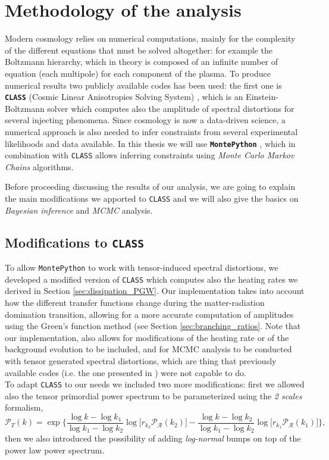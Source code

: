 \section{Methodology of the analysis}
Modern cosmology relies on numerical computations, mainly for the complexity of the different equations that must be solved altogether: for example the Boltzmann hierarchy, which in theory is composed of an infinite number of equation (each multipole) for each component of the plasma.
To produce numerical results two publicly available codes has been used: the first one is \textbf{\texttt{CLASS}} (Cosmic Linear Anisotropies Solving System) \cite{CLASS}, which is an Einstein-Boltzmann solver which computes also the amplitude of spectral distortions for several injecting phenomena. Since cosmology is now a data-driven science, a numerical approach is also needed to infer constraints from several experimental likelihoods and data available. In this thesis we will use \textbf{\texttt{MontePython}} \cite{Brinckmann:2018cvx,Audren:2012wb}, which in combination with \texttt{CLASS} allows inferring constraints using \emph{Monte Carlo Markov Chains} algorithms.

Before proceeding discussing the results of our analysis, we are going to explain the main modifications we apported to \texttt{CLASS} and we will also give the basics on \textit{Bayesian inference} and \textit{MCMC} analysis.


\subsection{Modifications to \texttt{CLASS}}
To allow \texttt{MontePython} to work with tensor-induced spectral distortions, we developed a modified version of \texttt{CLASS} which computes also the heating rates we derived in Section \ref{sec:dissipation_PGW}. Our implementation takes into account how the different transfer functions change during the matter-radiation domination transition, allowing for a more accurate computation of amplitudes using the Green's function method (see Section \ref{sec:branching_ratios}. Note that our implementation, also allows for modifications of the heating rate or of the background evolution to be included, and for MCMC analysis to be conducted with tensor generated spectral distortions, which are thing that previously available codes (i.e. the one presented in \cite{Kite_2021}) were not capable to do.\\
To adapt \texttt{CLASS} to our needs we included two more modifications: first we allowed also the tensor primordial power spectrum to be parameterized using the \emph{2 scales} formalism, 
$$\mathcal P_T(k)=\exp\bigg\{\frac{\log k-\log k_1}{\log k_1 -\log k_2}\log \Big[r_{k_2}\mathcal{P_R}(k_2)\Big]-\frac{\log k-\log k_2}{\log k_1 -\log k_2}\log \Big[r_{k_1}\mathcal{ P_{R}}(k_1)\Big]\bigg\},$$
 then we also introduced the possibility of adding \emph{log-normal} bumps on top of the power law power spectrum.
